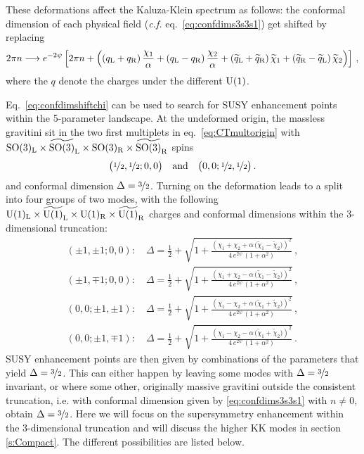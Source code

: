 \documentclass[a4paper, 11pt]{article}
\numberwithin{equation}{section}
\newcommand{\ts}[1]{\widetilde{#1}}
\newcommand{\+}{\oplus}
\begin{document}
These deformations affect the Kaluza-Klein spectrum as follows: the conformal dimension of each physical field (\textit{c.f.} eq.~\eqref{eq:confdims3s3s1}) get shifted by replacing
\begin{equation} \label{eq:confdimshiftchi}
	2\pi n\longrightarrow e^{-2\psi} \left[ 2\pi n + \Big((q_{\rm L}+q_{\rm R})\,\frac{\chi_{1}}{\alpha}+(q_{\rm L}-q_{\rm R})\,\frac{\chi_{2}}{\alpha}+ (\ts{q}_{\rm L}+\ts{q}_{\rm R})\,\ts{\chi}_{1} + (\ts{q}_{\rm R}-\ts{q}_{\rm L})\,\ts{\chi}_{2}\Big) \right]\,,
\end{equation}
where the $q$ denote the charges under the different ${\rm U}(1)$.

Eq.~\eqref{eq:confdimshiftchi} can be used to search for SUSY enhancement points within the 5-parameter landscape. At the undeformed origin, the massless gravitini sit in the two first multiplets in eq.~\eqref{eq:CTmultorigin} with ${\rm SO}(3)_{\rm L}\times\ts{{\rm SO}(3)}_{\rm L}\times{\rm SO}(3)_{\rm R}\times\ts{{\rm SO}(3)}_{\rm R}$ spins
\begin{equation}
	\big(\nicefrac{1}{2},\nicefrac{1}{2};0,0\big) \quad {\rm and} \quad \big(0,0;\nicefrac{1}{2},\nicefrac{1}{2}\big)\,.
\end{equation}
and conformal dimension $\Delta=\nicefrac{3}{2}$. Turning on the deformation leads to a split into four groups of two modes, with the following ${\rm U}(1)_{\rm L}\times\ts{{\rm U}(1)}_{\rm L}\times{\rm U}(1)_{\rm R}\times\ts{{\rm U}(1)}_{\rm R}$ charges and conformal dimensions within the 3-dimensional truncation:
\begin{equation}
	\begin{split}
		\left(\pm1,\pm1;0,0\right):\quad \Delta=\frac{1}{2}+\sqrt{1 + \frac{\left(%
		\chi_{1}+\chi_{2}+\alpha\,\big(\ts{\chi}_{1}-\ts{\chi}_{2}\big)\right)^{2}}{4\, e^{2\psi}\, (1+\alpha^{2})}}\,, \\
		\left(\pm1,\mp1;0,0\right):\quad \Delta=\frac{1}{2}+\sqrt{1 + \frac{\left(%
		\chi_{1}+\chi_{2}-\alpha\,\big(\ts{\chi}_{1}-\ts{\chi}_{2}\big)\right)^{2}}{4\, e^{2\psi}\, (1+\alpha^{2})}}\,, \\
		\left(0,0;\pm1,\pm1\right):\quad \Delta=\frac{1}{2}+\sqrt{1 + \frac{\left(%
		\chi_{1}-\chi_{2}+\alpha\,\big(\ts{\chi}_{1}+\ts{\chi}_{2}\big)\right)^{2}}{4\, e^{2\psi}\, (1+\alpha^{2})}}\,, \\
		\left(0,0;\pm1,\mp1\right):\quad \Delta=\frac{1}{2}+\sqrt{1 + \frac{\left(%
		\chi_{1}-\chi_{2} - \alpha\,\big(\ts{\chi}_{1}+\ts{\chi}_{2}\big)\right)^{2}}{4\, e^{2\psi}\, (1+\alpha^{2})}}\,.
	\end{split}
\end{equation}
SUSY enhancement points are then given by combinations of the parameters that yield $\Delta = \nicefrac32$. This can either happen by leaving some modes with $\Delta=\nicefrac{3}{2}$ invariant, or where some other, originally massive gravitini outside the consistent truncation, i.e. with conformal dimension given by \eqref{eq:confdims3s3s1} with $n \neq 0$, obtain $\Delta = \nicefrac32$. Here we will focus on the supersymmetry enhancement within the 3-dimensional truncation and will discuss the higher KK modes in section \ref{s:Compact}. The different possibilities are listed below.
\end{document}

